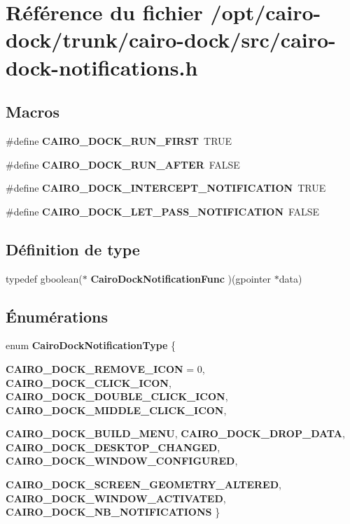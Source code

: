 \section{Référence du fichier /opt/cairo-dock/trunk/cairo-dock/src/cairo-dock-notifications.h}
\label{cairo-dock-notifications_8h}
\subsection*{Macros}
\begin{CompactItemize}
\item 
\#define {\bf CAIRO\_\-DOCK\_\-RUN\_\-FIRST}~TRUE
\item 
\#define {\bf CAIRO\_\-DOCK\_\-RUN\_\-AFTER}~FALSE
\item 
\#define {\bf CAIRO\_\-DOCK\_\-INTERCEPT\_\-NOTIFICATION}~TRUE
\item 
\#define {\bf CAIRO\_\-DOCK\_\-LET\_\-PASS\_\-NOTIFICATION}~FALSE
\end{CompactItemize}
\subsection*{Définition de type}
\begin{CompactItemize}
\item 
typedef gboolean($\ast$ {\bf CairoDockNotificationFunc} )(gpointer $\ast$data)
\end{CompactItemize}
\subsection*{Énumérations}
\begin{CompactItemize}
\item 
enum {\bf CairoDockNotificationType} \{ \par
{\bf CAIRO\_\-DOCK\_\-REMOVE\_\-ICON} = 0, 
{\bf CAIRO\_\-DOCK\_\-CLICK\_\-ICON}, 
{\bf CAIRO\_\-DOCK\_\-DOUBLE\_\-CLICK\_\-ICON}, 
{\bf CAIRO\_\-DOCK\_\-MIDDLE\_\-CLICK\_\-ICON}, 
\par
{\bf CAIRO\_\-DOCK\_\-BUILD\_\-MENU}, 
{\bf CAIRO\_\-DOCK\_\-DROP\_\-DATA}, 
{\bf CAIRO\_\-DOCK\_\-DESKTOP\_\-CHANGED}, 
{\bf CAIRO\_\-DOCK\_\-WINDOW\_\-CONFIGURED}, 
\par
{\bf CAIRO\_\-DOCK\_\-SCREEN\_\-GEOMETRY\_\-ALTERED}, 
{\bf CAIRO\_\-DOCK\_\-WINDOW\_\-ACTIVATED}, 
{\bf CAIRO\_\-DOCK\_\-NB\_\-NOTIFICATIONS}
 \}
\end{CompactItemize}
